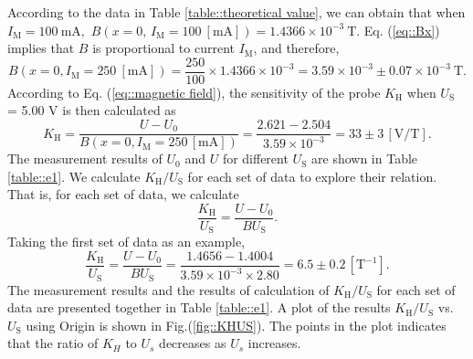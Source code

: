 \documentclass[a4paper]{article}
\begin{document}
According to the data in Table \ref{table::theoretical value}, we can obtain that when $I_\text{M} = 100 \ \text{mA},$
$B(x=0,\,I_\text{M}=100\ [\text{mA}])=1.4366\times10^{-3} \ \text{T}.$
Eq. (\ref{eq::Bx}) implies that $B$ is proportional to current $I_\text{M}$, and therefore,
\begin{equation*}
	B(x=0,I_\text{M}=250\ [\text{mA}]) = \frac{250}{100} \times 1.4366\times10^{-3} = 3.59\times 10^{-3} \pm 0.07 \times 10^{-3}\ \text{T}.
\end{equation*}
According to Eq. (\ref{eq::magnetic field}), the sensitivity of the probe $K_\text{H}$ when $U_\text{S}$ = 5.00 V is then calculated as
\begin{equation*}
	K_\text{H} = \frac{U-U_0}{B(x=0,I_\text{M}=250\,[\text{mA}])} = \frac{2.621-2.504}{3.59\times 10^{-3}} = 33 \pm 3 \,[\text{V}/\text{T}].
\end{equation*}
The measurement results of $U_0$ and $U$ for different $U_\text{S}$ are shown in Table \ref{table::e1}. We calculate $K_\text{H}/U_\text{S}$ for each set of data to
explore their relation. That is, for each set of data, we calculate
\begin{equation*}
	\frac{K_\text{H}}{U_\text{S}} = \frac{U-U_0}{BU_\text{S}}.
\end{equation*}
Taking the first set of data as an example,
\begin{equation*}
	\frac{K_\text{H}}{U_\text{S}} = \frac{U-U_0}{BU_\text{S}} = \frac{1.4656-1.4004}{3.59\times 10^{-3}\times2.80} =  6.5 \pm 0.2 \,[\text{T}^{-1}].
\end{equation*}
The measurement results and the results of calculation of $K_\text{H}/U_\text{S}$ for each set of data are presented together in Table \ref{table::e1}.
A plot of the results $K_\text{H}/U_\text{S}$ vs. $U_\text{S}$ using Origin is shown in Fig.(\ref{fig::KHUS}).
The points in the plot indicates that the ratio of $K_{H}$ to $U_{s}$ decreases as $U_{s}$ increases.
\end{document}
